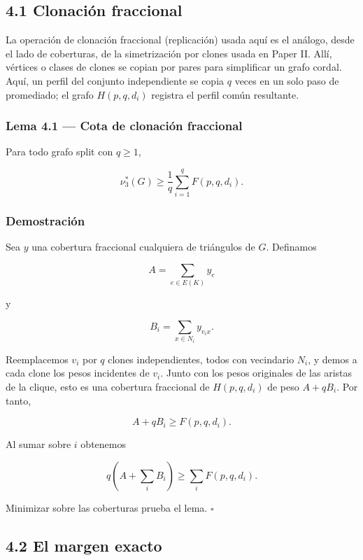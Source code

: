 \documentclass[spanish,11pt,a4paper]{article}
\begin{document}
\subsection{4.1 Clonación fraccional}\label{clonaciuxf3n-fraccional}

La operación de clonación fraccional (replicación) usada aquí es el
análogo, desde el lado de coberturas, de la simetrización por clones
usada en Paper II. Allí, vértices o clases de clones se copian por pares
para simplificar un grafo cordal. Aquí, un perfil del conjunto
independiente se copia \(q\) veces en un solo paso de promediado; el
grafo \(H(p,q,d_i)\) registra el perfil común resultante.

\subsubsection{Lema 4.1 --- Cota de clonación
fraccional}\label{lema-4.1-cota-de-clonaciuxf3n-fraccional}

Para todo grafo split con \(q\ge1\),

\[
\boxed{
\nu_3^*(G)
\ge
\frac1q\sum_{i=1}^qF(p,q,d_i)
}.
\tag{4.1}
\]

\subsubsection{Demostración}\label{demostraciuxf3n-1}

Sea \(y\) una cobertura fraccional cualquiera de triángulos de \(G\).
Definamos

\[
A=\sum_{e\in E(K)}y_e
\]

y

\[
B_i=\sum_{x\in N_i}y_{v_ix}.
\]

Reemplacemos \(v_i\) por \(q\) clones independientes, todos con
vecindario \(N_i\), y demos a cada clone los pesos incidentes de
\(v_i\). Junto con los pesos originales de las aristas de la clique,
esto es una cobertura fraccional de \(H(p,q,d_i)\) de peso \(A+qB_i\).
Por tanto,

\[
A+qB_i\ge F(p,q,d_i).
\]

Al sumar sobre \(i\) obtenemos

\[
q\left(A+\sum_iB_i\right)
\ge
\sum_iF(p,q,d_i).
\]

Minimizar sobre las coberturas prueba el lema. \(\square\)

\subsection{4.2 El margen exacto}\label{el-margen-exacto}
\end{document}
